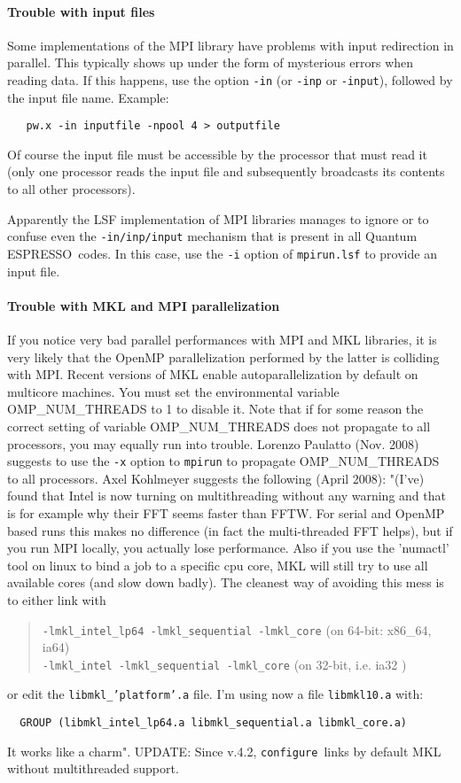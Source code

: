 \documentclass[12pt,a4paper]{article}
\def\qe{{\sc Quantum ESPRESSO}}
\def\configure{\texttt{configure}}
\begin{document}
\paragraph{Trouble with input files}
Some implementations of the MPI library have problems with input 
redirection in parallel. This typically shows up under the form of
mysterious errors when reading data. If this happens, use the option 
\texttt{-in} (or \texttt{-inp} or \texttt{-input}), followed by the input file name. 
Example:
\begin{verbatim}
   pw.x -in inputfile -npool 4 > outputfile
\end{verbatim} 
Of course the 
input file must be accessible by the processor that must read it
(only one processor reads the input file and subsequently broadcasts
its contents to all other processors).

Apparently the LSF implementation of MPI libraries manages to ignore or to
confuse even the \texttt{-in/inp/input} mechanism that is present in all
\qe\ codes. In this case, use the \texttt{-i} option of \texttt{mpirun.lsf}
to provide an input file.

\paragraph{Trouble with MKL and MPI parallelization}
If you notice very bad parallel performances with MPI and MKL libraries, 
it is very likely that the OpenMP parallelization performed by the latter 
is colliding with MPI. Recent versions of MKL enable autoparallelization
by default on multicore machines.  You must set the environmental variable
OMP\_NUM\_THREADS to 1 to disable it. 
Note that if for some reason the correct setting  of variable
OMP\_NUM\_THREADS  
does not propagate to all processors, you may equally run into trouble. 
Lorenzo Paulatto (Nov. 2008) suggests to use the \texttt{-x} option to \texttt{mpirun} to 
propagate OMP\_NUM\_THREADS to all processors.
Axel Kohlmeyer suggests the following (April 2008): 
"(I've) found that Intel is now turning on multithreading without any
warning and that is for example why their FFT seems faster than
FFTW. For serial and OpenMP based runs this makes no difference (in
fact the multi-threaded FFT helps), but if you run MPI locally, you
actually lose performance. Also if you use the 'numactl' tool on linux
to bind a job to a specific cpu core, MKL will still try to use all
available cores (and slow down badly). The cleanest way of avoiding
this mess is to either link with
\begin{quote}
\texttt{-lmkl\_intel\_lp64 -lmkl\_sequential -lmkl\_core} (on 64-bit: 
x86\_64, ia64)\\
\texttt{-lmkl\_intel -lmkl\_sequential -lmkl\_core} (on 32-bit, i.e. ia32 )
\end{quote}
or edit the \texttt{libmkl\_'platform'.a} file. I'm using now a file 
\texttt{libmkl10.a} with:
\begin{verbatim}
  GROUP (libmkl_intel_lp64.a libmkl_sequential.a libmkl_core.a)
\end{verbatim}
It works like a charm". UPDATE: Since v.4.2, \configure\ links by
default MKL without multithreaded support.
\end{document}
